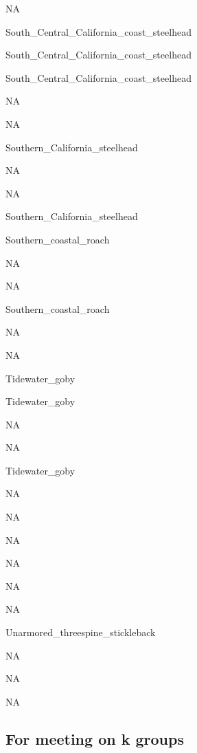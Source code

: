 \documentclass[]{article}
\begin{document}
NA

South\_Central\_California\_coast\_steelhead

South\_Central\_California\_coast\_steelhead

South\_Central\_California\_coast\_steelhead

NA

NA

Southern\_California\_steelhead

NA

NA

Southern\_California\_steelhead

Southern\_coastal\_roach

NA

NA

Southern\_coastal\_roach

NA

NA

Tidewater\_goby

Tidewater\_goby

NA

NA

Tidewater\_goby

NA

NA

NA

NA

NA

NA

Unarmored\_threespine\_stickleback

NA

NA

NA

\subsection{For meeting on k groups}\label{for-meeting-on-k-groups}
\end{document}
